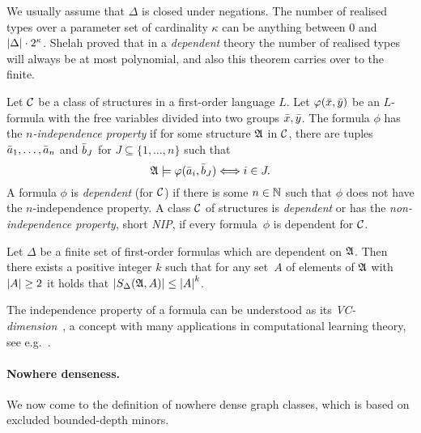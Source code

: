 We usually assume that $\Delta$ is closed under negations. 
The number of realised types over a parameter set of cardinality
$\kappa$ can be anything between $0$ and $\left\lvert\Delta\right\rvert\cdot 2^\kappa$. 
Shelah proved that
in a \emph{dependent} theory the number of realised types will always be
at most polynomial, and also this theorem carries over to the finite. 

\begin{definition}
Let $\cal C$ be a class of structures in a first-order language $L$. Let 
$\varphi(\bar{x},\bar{y})$ be an $L$-formula with the free variables
divided into two groups $\bar{x}, \bar{y}$. The formula $\phi$ has
the \emph{$n$-independence property} if for some structure $\mathfrak{A}$ in $\cal C$, there are tuples $\bar{a}_1,\ldots, \bar{a}_{n}$ and
$\bar{b}_J$ for $J\subseteq \{1,\ldots, n\}$ such that
\[\mathfrak{A}\models\varphi(\bar{a}_i,\bar{b}_J)\Longleftrightarrow i\in J. \]
A formula $\phi$ is \emph{dependent} (for $\cal C$) if there is 
some $n\in \mathbb{N}$ such that $\phi$ does not have the $n$-independence property.
A class $\mathcal{C}$ of structures is \emph{dependent} or has the \emph{non-independence property}, 
short \emph{NIP}, if every formula~$\phi$ is dependent for $\cal C$. 
\end{definition}

\begin{theorem}
Let $\Delta$ be a finite set of first-order formulas which are 
dependent on $\mathfrak{A}$. Then there exists a positive integer $k$ such that 
for any set~$A$ of elements of $\mathfrak{A}$ with $\left\lvert A\right\rvert\geq 2$ it holds that
$\left\lvert S_\Delta(\mathfrak{A},A)\right\rvert\leq \left\lvert A\right\rvert^k$. 
\end{theorem}

The independence property of a formula can be understood as its 
\emph{VC-dimension}~\cite{vapnik2015uniform,laskowski1992vapnik}, 
a concept with many applications in computational
learning theory, see e.g.~\cite{}. 

\paragraph{Nowhere denseness.}
We now come to the definition of nowhere dense graph classes, which is based
on excluded bounded-depth minors. 

